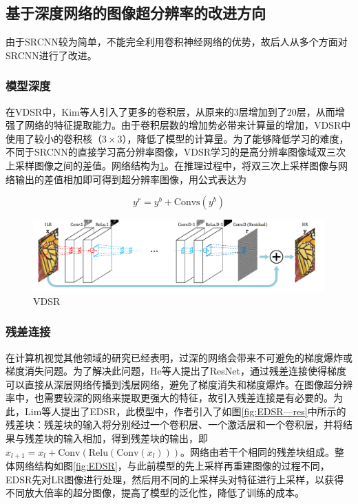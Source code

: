 \subsection{基于深度网络的图像超分辨率的改进方向}

由于SRCNN较为简单，不能完全利用卷积神经网络的优势，故后人从多个方面对SRCNN进行了改进。

\subsubsection*{模型深度}
在VDSR中，Kim等人引入了更多的卷积层，从原来的3层增加到了20层，从而增强了网络的特征提取能力。由于卷积层数的增加势必带来计算量的增加，VDSR中使用了较小的卷积核（$3\times3$），降低了模型的计算量。为了能够降低学习的难度，不同于SRCNN的直接学习高分辨率图像，VDSR学习的是高分辨率图像域双三次上采样图像之间的差值。网络结构为\ref{fig:VDSR}。在推理过程中，将双三次上采样图像与网络输出的差值相加即可得到超分辨率图像，用公式表达为

\begin{equation}
    y^r = y^b + \text{Convs}(y^b)
\end{equation}

\begin{figure}[htbp]
    \centering
    \includegraphics[width=1.0\textwidth]{imgs/VDSR.png}
    \caption{VDSR}
    \label{fig:VDSR}
\end{figure}

\subsubsection*{残差连接}
在计算机视觉其他领域的研究已经表明，过深的网络会带来不可避免的梯度爆炸或梯度消失问题。为了解决此问题，He等人提出了ResNet，通过残差连接使得梯度可以直接从深层网络传播到浅层网络，避免了梯度消失和梯度爆炸。在图像超分辨率中，也需要较深的网络来提取更强大的特征，故引入残差连接是有必要的。为此，Lim等人提出了EDSR，此模型中，作者引入了如图\ref{fig:EDSR—res}中所示的残差块：残差块的输入将分别经过一个卷积层、一个激活层和一个卷积层，并将结果与残差块的输入相加，得到残差块的输出，即$x_{l+1}=x_l+\text{Conv}(\text{Relu}(\text{Conv}(x_l)))$。网络由若干个相同的残差块组成。整体网络结构如图\ref{fig:EDSR}，与此前模型的先上采样再重建图像的过程不同，EDSR先对LR图像进行处理，然后用不同的上采样头对特征进行上采样，以获得不同放大倍率的超分图像，提高了模型的泛化性，降低了训练的成本。


